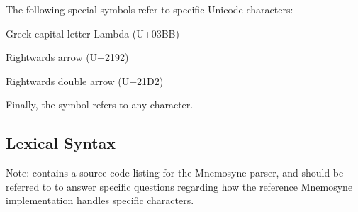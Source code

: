 The following special symbols refer to specific Unicode characters:
\begin{description}
    \item{} Greek capital letter Lambda (U+03BB)
    \item{} Rightwards arrow (U+2192)
    \item{} Rightwards double arrow (U+21D2)
\end{description}

Finally, the symbol  refers to any character.

\subsection{Lexical Syntax}
Note:  contains a source code listing for the Mnemosyne parser, and should be referred to to answer specific questions regarding how the reference Mnemosyne implementation handles specific characters.

